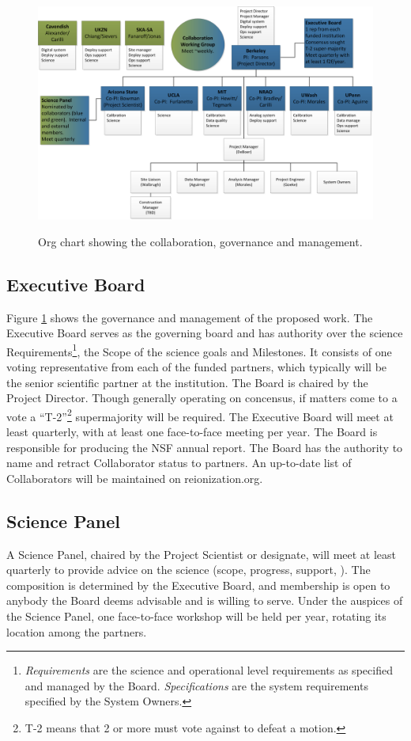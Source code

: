 \documentclass[preprint]{aastex}
\begin{document}
\begin{figure}[h]
\centering
\includegraphics[width=\textwidth]{plots/org.png}
\label{fig:org}
\caption{Org chart showing the collaboration, governance and management.}
\end{figure}

\subsection{Executive Board}
Figure \ref{fig:org} shows the governance and management of the proposed work. 
The Executive Board serves as the governing board and has authority over the science 
Requirements\footnote{{\em Requirements} are the science and operational level requirements as
specified and managed by the Board.  {\em Specifications} are the system requirements
specified by the System Owners.}, the Scope of the science goals and Milestones. It consists 
of one voting representative from each of the funded partners, which typically will be the 
senior scientific partner at the institution. The Board is chaired by the Project Director. Though 
generally operating on concensus, if matters come to a vote a ``T-2''\footnote{T-2 means that 2
or more must vote against to defeat a motion.} supermajority will be required. The
Executive Board will meet at least quarterly, with at least one face-to-face meeting
per year. The Board is responsible for producing the NSF annual report.  The Board has the
authority to name and retract Collaborator status to partners.  An up-to-date list of Collaborators
will be maintained on reionization.org.

\subsection{Science Panel}
A Science Panel, chaired by the Project Scientist or designate, will meet at least
quarterly to provide advice on the science (scope, progress, support, ). The
composition is determined by the Executive Board, and membership is open to anybody
the Board deems advisable and is willing to serve. Under the auspices of the Science
Panel, one face-to-face workshop will be held per year, rotating its location among
the partners.
\end{document}
